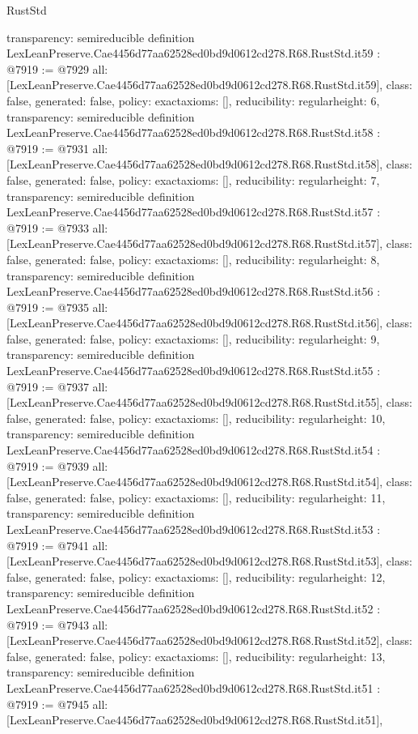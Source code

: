 \begin{lexlean}{RustStd}
\begin{coremodule}
{  transparency: semireducible
}
definition LexLeanPreserve.Cae4456d77aa62528ed0bd9d0612cd278.R68.RustStd.it59 : @7919 := @7929 {
  all: [LexLeanPreserve.Cae4456d77aa62528ed0bd9d0612cd278.R68.RustStd.it59],
  class: false,
  generated: false,
  policy: exact{axioms: []},
  reducibility: regular{height: 6},
  transparency: semireducible
}
definition LexLeanPreserve.Cae4456d77aa62528ed0bd9d0612cd278.R68.RustStd.it58 : @7919 := @7931 {
  all: [LexLeanPreserve.Cae4456d77aa62528ed0bd9d0612cd278.R68.RustStd.it58],
  class: false,
  generated: false,
  policy: exact{axioms: []},
  reducibility: regular{height: 7},
  transparency: semireducible
}
definition LexLeanPreserve.Cae4456d77aa62528ed0bd9d0612cd278.R68.RustStd.it57 : @7919 := @7933 {
  all: [LexLeanPreserve.Cae4456d77aa62528ed0bd9d0612cd278.R68.RustStd.it57],
  class: false,
  generated: false,
  policy: exact{axioms: []},
  reducibility: regular{height: 8},
  transparency: semireducible
}
definition LexLeanPreserve.Cae4456d77aa62528ed0bd9d0612cd278.R68.RustStd.it56 : @7919 := @7935 {
  all: [LexLeanPreserve.Cae4456d77aa62528ed0bd9d0612cd278.R68.RustStd.it56],
  class: false,
  generated: false,
  policy: exact{axioms: []},
  reducibility: regular{height: 9},
  transparency: semireducible
}
definition LexLeanPreserve.Cae4456d77aa62528ed0bd9d0612cd278.R68.RustStd.it55 : @7919 := @7937 {
  all: [LexLeanPreserve.Cae4456d77aa62528ed0bd9d0612cd278.R68.RustStd.it55],
  class: false,
  generated: false,
  policy: exact{axioms: []},
  reducibility: regular{height: 10},
  transparency: semireducible
}
definition LexLeanPreserve.Cae4456d77aa62528ed0bd9d0612cd278.R68.RustStd.it54 : @7919 := @7939 {
  all: [LexLeanPreserve.Cae4456d77aa62528ed0bd9d0612cd278.R68.RustStd.it54],
  class: false,
  generated: false,
  policy: exact{axioms: []},
  reducibility: regular{height: 11},
  transparency: semireducible
}
definition LexLeanPreserve.Cae4456d77aa62528ed0bd9d0612cd278.R68.RustStd.it53 : @7919 := @7941 {
  all: [LexLeanPreserve.Cae4456d77aa62528ed0bd9d0612cd278.R68.RustStd.it53],
  class: false,
  generated: false,
  policy: exact{axioms: []},
  reducibility: regular{height: 12},
  transparency: semireducible
}
definition LexLeanPreserve.Cae4456d77aa62528ed0bd9d0612cd278.R68.RustStd.it52 : @7919 := @7943 {
  all: [LexLeanPreserve.Cae4456d77aa62528ed0bd9d0612cd278.R68.RustStd.it52],
  class: false,
  generated: false,
  policy: exact{axioms: []},
  reducibility: regular{height: 13},
  transparency: semireducible
}
definition LexLeanPreserve.Cae4456d77aa62528ed0bd9d0612cd278.R68.RustStd.it51 : @7919 := @7945 {
  all: [LexLeanPreserve.Cae4456d77aa62528ed0bd9d0612cd278.R68.RustStd.it51],
}
\end{coremodule}
\end{lexlean}
